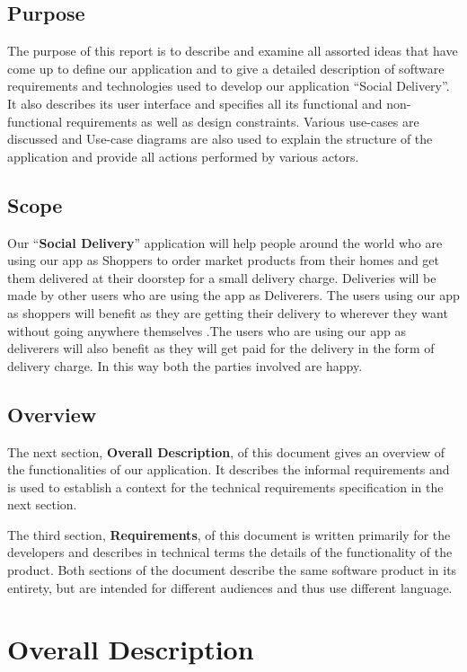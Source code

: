 \documentclass{report}
\begin{document}
\subsection{Purpose}
The purpose of this report is to describe and examine all assorted ideas that have come up to define our application and to give a detailed description of software requirements and technologies used to develop our application “Social Delivery”. It also describes its user interface and specifies all its functional and non-functional requirements as well as design constraints. Various use-cases are discussed and Use-case diagrams are also used to explain the structure of the application and provide all actions performed by various actors.

\subsection{Scope}
Our “\textbf{Social Delivery}” application will help people around the world who are using our app as Shoppers to order market products from their homes and get them delivered at their doorstep for a small delivery charge. Deliveries will be made by other users who are using the app as Deliverers.
The users using our app as shoppers will benefit as they are getting their delivery to wherever they want without going anywhere themselves .The users who are using our app as deliverers will also benefit as they will get paid for the delivery in the form of delivery charge.
In this way both the parties involved are happy.

\subsection{Overview}
The next section, \textbf{Overall Description}, of this document gives an overview of the functionalities of our application. It describes the informal requirements and is used to establish a context for the technical requirements specification in the next section. 

The third section, \textbf{Requirements}, of this document is written primarily for the developers and describes in technical terms the details of the functionality of the product. 
Both sections of the document describe the same software product in its entirety, but are intended for different audiences and thus use different language.


\section{Overall Description}
\end{document}
